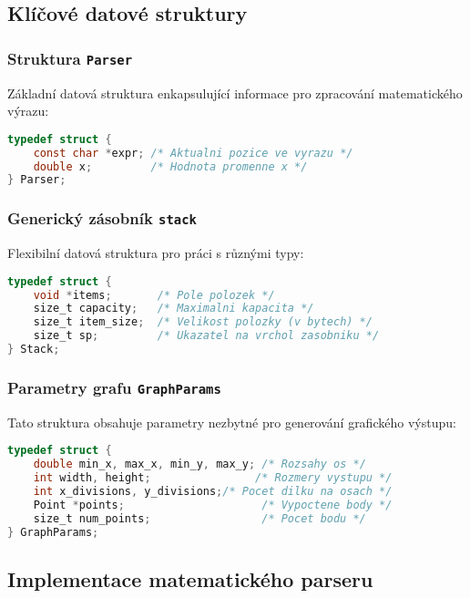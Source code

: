 \documentclass[12pt]{article} %
\begin{document}
\subsection{Klíčové datové struktury}

\subsubsection{Struktura \texttt{Parser}}
Základní datová struktura enkapsulující informace pro zpracování matematického výrazu:
\begin{lstlisting}[language=C, caption=Struktura Parser]
typedef struct {
    const char *expr; /* Aktualni pozice ve vyrazu */
    double x;         /* Hodnota promenne x */
} Parser;
\end{lstlisting}

\subsubsection{Generický zásobník \texttt{stack}}
Flexibilní datová struktura pro práci s různými typy:
\begin{lstlisting}[language=C, caption=Struktura Stack]
typedef struct {
    void *items;       /* Pole polozek */
    size_t capacity;   /* Maximalni kapacita */
    size_t item_size;  /* Velikost polozky (v bytech) */
    size_t sp;         /* Ukazatel na vrchol zasobniku */
} Stack;
\end{lstlisting}

\subsubsection{Parametry grafu \texttt{GraphParams}}
Tato struktura obsahuje parametry nezbytné pro generování grafického výstupu:
\begin{lstlisting}[language=C, caption=Struktura GraphParams]
typedef struct {
    double min_x, max_x, min_y, max_y; /* Rozsahy os */
    int width, height;                /* Rozmery vystupu */
    int x_divisions, y_divisions;/* Pocet dilku na osach */
    Point *points;                     /* Vypoctene body */
    size_t num_points;                 /* Pocet bodu */
} GraphParams;
\end{lstlisting}
\newpage

\subsection{Implementace matematického parseru}
\end{document}

